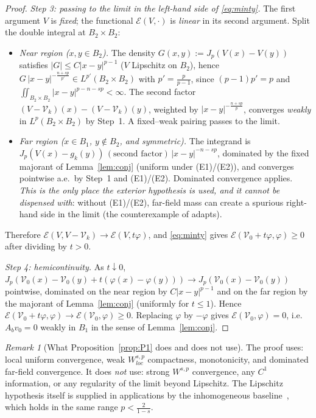 \documentclass[11pt]{amsart}
\theoremstyle{plain}
\theoremstyle{definition}
\theoremstyle{remark}
\newtheorem{remark}[theorem]{Remark}
\begin{document}
\begin{proof}
\emph{Step 3: passing to the limit in the left-hand side of
\eqref{eq:minty}.} The first argument $V$ is \emph{fixed}; the functional
$\mathcal E(V,\cdot)$ is \emph{linear} in its second argument. Split the
double integral at $B_2\times B_2$:
\begin{itemize}[leftmargin=2em]
\item \emph{Near region ($x,y\in B_2$).} The density
$G(x,y):=J_p(V(x)-V(y))$ satisfies
$|G|\le C|x-y|^{p-1}$ \textnormal{(}$V$ Lipschitz on $B_2$\textnormal{)},
hence $G\,|x-y|^{-\frac{n+sp}{p'}}\in L^{p'}(B_2\times B_2)$ with
$p'=\frac{p}{p-1}$, since $(p-1)p'=p$ and
$\iint_{B_2\times B_2}|x-y|^{p-n-sp}<\infty$. The second factor
$(V-\mathcal V_k)(x)-(V-\mathcal V_k)(y)$, weighted by
$|x-y|^{-\frac{n+sp}{p}}$, converges \emph{weakly} in
$L^p(B_2\times B_2)$ by Step~1. A fixed--weak pairing passes to the limit.
\item \emph{Far region ($x\in B_1$, $y\notin B_2$, and symmetric).} The
integrand is
$J_p(V(x)-g_k(y))\,(\text{second factor})\,|x-y|^{-n-sp}$, dominated by the
fixed majorant of Lemma~\ref{lem:conj}
\textnormal{(}uniform under (E1)/(E2)\textnormal{)}, and converges pointwise
a.e.\ by Step~1 and (E1)/(E2). Dominated convergence applies. \emph{This is
the only place the exterior hypothesis is used, and it cannot be dispensed
with}: without (E1)/(E2), far-field mass can create a spurious right-hand
side in the limit \textnormal{(}the counterexample of
\cite[Rem.~4.4]{CSapprox} adapts\textnormal{)}.
\end{itemize}
Therefore $\mathcal E(V,V-\mathcal V_k)\to\mathcal E(V,t\varphi)$, and
\eqref{eq:minty} gives $\mathcal E(\mathcal V_0+t\varphi,\varphi)\ge0$ after
dividing by $t>0$.

\emph{Step 4: hemicontinuity.} As $t\downarrow0$,
$J_p(\mathcal V_0(x)-\mathcal V_0(y)+t(\varphi(x)-\varphi(y)))\to
J_p(\mathcal V_0(x)-\mathcal V_0(y))$ pointwise, dominated on the near
region by $C|x-y|^{p-1}$ and on the far region by the majorant of
Lemma~\ref{lem:conj} \textnormal{(}uniformly for $t\le1$\textnormal{)}.
Hence $\mathcal E(\mathcal V_0+t\varphi,\varphi)\to
\mathcal E(\mathcal V_0,\varphi)\ge0$. Replacing $\varphi$ by $-\varphi$
gives $\mathcal E(\mathcal V_0,\varphi)=0$, i.e.\ $A_bv_0=0$ weakly in
$B_1$ in the sense of Lemma~\ref{lem:conj}.
\end{proof}

\begin{remark}[What Proposition~\ref{prop:P1} does and does not use]
The proof uses: local uniform convergence, weak $W^{s,p}_{loc}$ compactness,
monotonicity, and dominated far-field convergence. It does \emph{not} use:
strong $W^{s,p}$ convergence, any $C^1$ information, or any regularity of the
limit beyond Lipschitz. The Lipschitz hypothesis itself is supplied in
applications by the inhomogeneous baseline~\cite{BT}, which holds in the same
range $p<\frac2{1-s}$.
\end{remark}
\end{document}
